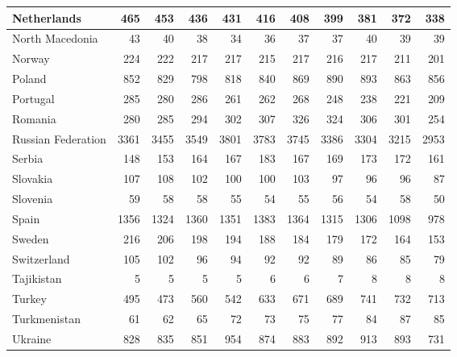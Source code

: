 \begin{table}
\begin{tabular}{|l|r|r|r|r|r|r|r|r|r|r|}
                   Netherlands&    465&    453&    436&    431&    416&    408&    399&    381&    372&    338\\\hline
               North Macedonia&     43&     40&     38&     34&     36&     37&     37&     40&     39&     39\\\hline
                        Norway&    224&    222&    217&    217&    215&    217&    216&    217&    211&    201\\\hline
                        Poland&    852&    829&    798&    818&    840&    869&    890&    893&    863&    856\\\hline
                      Portugal&    285&    280&    286&    261&    262&    268&    248&    238&    221&    209\\\hline
                       Romania&    280&    285&    294&    302&    307&    326&    324&    306&    301&    254\\\hline
            Russian Federation&   3361&   3455&   3549&   3801&   3783&   3745&   3386&   3304&   3215&   2953\\\hline
                        Serbia&    148&    153&    164&    167&    183&    167&    169&    173&    172&    161\\\hline
                      Slovakia&    107&    108&    102&    100&    100&    103&     97&     96&     96&     87\\\hline
                      Slovenia&     59&     58&     58&     55&     54&     55&     56&     54&     58&     50\\\hline
                         Spain&   1356&   1324&   1360&   1351&   1383&   1364&   1315&   1306&   1098&    978\\\hline
                        Sweden&    216&    206&    198&    194&    188&    184&    179&    172&    164&    153\\\hline
                   Switzerland&    105&    102&     96&     94&     92&     92&     89&     86&     85&     79\\\hline
                    Tajikistan&      5&      5&      5&      5&      6&      6&      7&      8&      8&      8\\\hline
                        Turkey&    495&    473&    560&    542&    633&    671&    689&    741&    732&    713\\\hline
                  Turkmenistan&     61&     62&     65&     72&     73&     75&     77&     84&     87&     85\\\hline
                       Ukraine&    828&    835&    851&    954&    874&    883&    892&    913&    893&    731\\\hline

\end{tabular}
\end{table}
